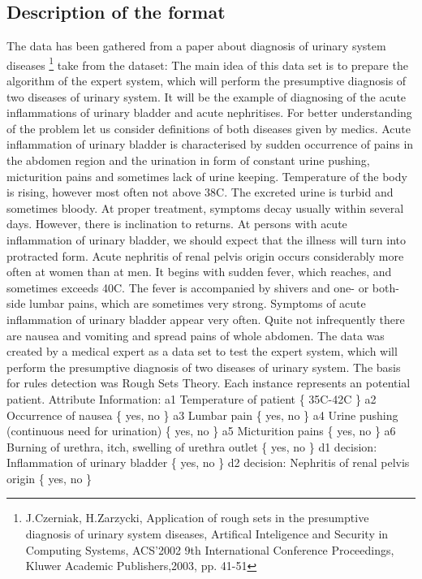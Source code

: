 \documentclass[a4paper,twoside,11pt]{article}
\begin{document}
\subsection{Description of the format}
The data has been gathered from a paper about diagnosis of urinary system diseases \footnote{J.Czerniak, H.Zarzycki, Application of rough sets in the presumptive diagnosis of urinary system diseases, Artifical Inteligence and Security in Computing Systems, ACS'2002 9th International Conference Proceedings, Kluwer Academic Publishers,2003, pp. 41-51} \newline
take from the dataset: \newline
The main idea of this data set is to prepare the algorithm of the expert system, which will perform the presumptive diagnosis of two diseases of urinary system. It will be the example of diagnosing of the acute inflammations of urinary bladder and acute nephritises. For better understanding of the problem let us consider definitions of both diseases given by medics. Acute inflammation of urinary bladder is characterised by sudden occurrence of pains in the abdomen region and the urination in form of constant urine pushing, micturition pains and sometimes lack of urine keeping. Temperature of the body is rising, however most often not above 38C. The excreted urine is turbid and sometimes bloody. At proper treatment, symptoms decay usually within
several days. However, there is inclination to returns. At persons with acute inflammation of urinary bladder, we should expect that the illness will turn into protracted form. \newline
Acute nephritis of renal pelvis origin occurs considerably more often at women than at men. It begins with sudden fever, which reaches, and sometimes exceeds 40C. The fever is accompanied by shivers and one- or both-side lumbar pains, which are sometimes very strong. Symptoms of acute inflammation of urinary bladder appear very often. Quite not infrequently there are nausea and vomiting and spread pains of whole abdomen. \newline
The data was created by a medical expert as a data set to test the expert system, which will perform the presumptive diagnosis of two diseases of urinary system. The basis for rules detection was Rough Sets Theory. Each instance represents an potential patient. \newline
Attribute Information: \newline
a1 Temperature of patient \{ 35C-42C \} \newline
a2 Occurrence of nausea \{ yes, no \} \newline
a3 Lumbar pain \{ yes, no \} \newline
a4 Urine pushing (continuous need for urination) \{ yes, no \} \newline
a5 Micturition pains \{ yes, no \} \newline
a6 Burning of urethra, itch, swelling of urethra outlet \{ yes, no \} \newline
d1 decision: Inflammation of urinary bladder \{ yes, no \} \newline
d2 decision: Nephritis of renal pelvis origin \{ yes, no \} \newline
\newpage
\end{document}
